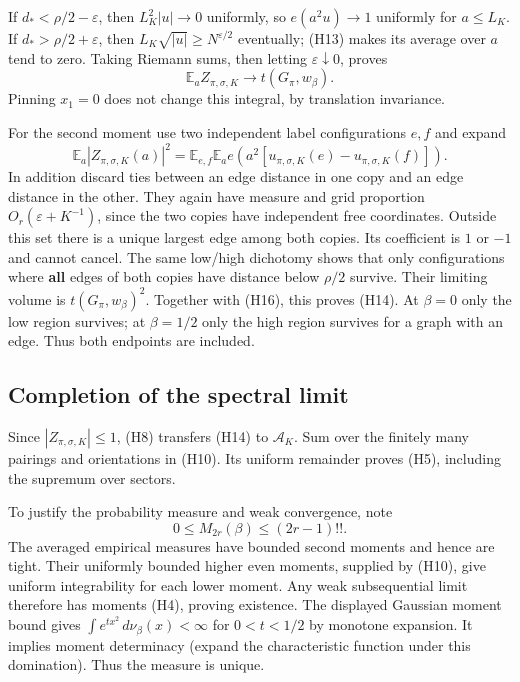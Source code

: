 If \(d_*<\rho/2-\varepsilon\), then
\(L_K^2|u|\to0\) uniformly, so \(e(a^2u)\to1\) uniformly for \(a\le L_K\).
If \(d_*>\rho/2+\varepsilon\), then
\(L_K\sqrt{|u|}\ge N^{\varepsilon/2}\) eventually; (H13) makes its
average over \(a\) tend to zero. Taking Riemann sums, then letting
\(\varepsilon\downarrow0\), proves
\[
 \mathbb E_a Z_{\pi,\sigma,K}\longrightarrow t(G_\pi,w_\beta).
                                                               \tag{H16}
\]
Pinning \(x_1=0\) does not change this integral, by translation invariance.

For the second moment use two independent label configurations \(e,f\)
and expand
\[
 \mathbb E_a|Z_{\pi,\sigma,K}(a)|^2
 =\mathbb E_{e,f}\mathbb E_a
           e\!\left(a^2[u_{\pi,\sigma,K}(e)-u_{\pi,\sigma,K}(f)]\right).
                                                               \tag{H17}
\]
In addition discard ties between an edge distance in one copy and an edge
distance in the other. They again have measure and grid proportion
\(O_r(\varepsilon+K^{-1})\), since the two copies have independent free
coordinates. Outside this set there is a unique largest edge among both
copies. Its coefficient is \(1\) or \(-1\) and cannot cancel.
The same low/high dichotomy shows that only configurations where \textbf{all}
edges of both copies have distance below \(\rho/2\) survive. Their limiting
volume is \(t(G_\pi,w_\beta)^2\). Together with (H16), this proves (H14).
At \(\beta=0\) only the low region survives; at \(\beta=1/2\) only the high
region survives for a graph with an edge. Thus both endpoints are included.

\hypertarget{pell-harmonic-completion-of-the-spectral-limit}{%
\subsection{Completion of the spectral limit}\label{pell-harmonic-completion-of-the-spectral-limit}}

Since \(|Z_{\pi,\sigma,K}|\le1\), (H8) transfers (H14) to \(\mathcal A_K\).
Sum over the finitely many pairings and orientations in (H10). Its uniform
remainder proves (H5), including the supremum over sectors.

To justify the probability measure and weak convergence, note
\[
 0\le M_{2r}(\beta)\le(2r-1)!!.
\]
The averaged empirical measures have bounded second moments and hence
are tight. Their uniformly bounded higher even moments, supplied by
(H10), give uniform integrability for each lower moment. Any weak
subsequential limit therefore has moments (H4), proving existence.
The displayed Gaussian moment bound gives
\(\int e^{t x^2}\,d\nu_\beta(x)<\infty\) for \(0<t<1/2\) by monotone expansion.
It implies moment determinacy (expand the characteristic function under
this domination). Thus the measure is unique.

